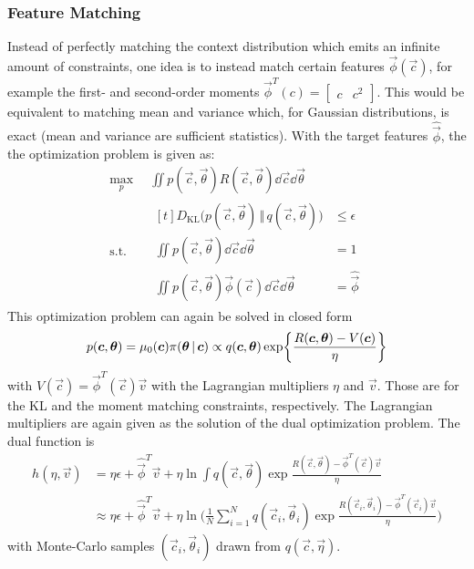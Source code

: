 			\subsubsection{Feature Matching}
				Instead of perfectly matching the context distribution which emits an infinite amount of constraints, one idea is to instead match certain features \( \vec{\phi}(\vec{c}) \), for example the first- and second-order moments \( \vec{\phi}^T(c) = \begin{bmatrix} c & c^2 \end{bmatrix} \). This would be equivalent to matching mean and variance which, for Gaussian distributions, is exact (mean and variance are sufficient statistics). With the target features \( \hat{\vec{\phi}} \), the the optimization problem is given as:
				\begin{equation*}
					\begin{aligned}
						\max_p \,           & \iint\! p(\vec{c}, \vec{\theta}) R(\vec{c}, \vec{\theta}) \dd{\vec{c}} \dd{\vec{\theta}} \\
						\mathrm{s.t.} \quad &
						\begin{aligned}[t]
							D_\mathrm{KL}\big( p(\vec{c}, \vec{\theta}) \,\Vert\, q(\vec{c}, \vec{\theta}) \big) & \leq \epsilon      \\
							\iint\! p(\vec{c}, \vec{\theta}) \dd{\vec{c}} \dd{\vec{\theta}}                      & = 1                \\
							\iint\! p(\vec{c}, \vec{\theta}) \vec{\phi}(\vec{c}) \dd{\vec{c}} \dd{\vec{\theta}}  & = \hat{\vec{\phi}}
						\end{aligned}
					\end{aligned}
				\end{equation*}
				This optimization problem can again be solved in closed form
				\begin{equation*}
					p(\bm{c}, \bm{\theta})
					= \mu_0(\bm{c}) \pi(\bm{\theta} \,\vert\, \bm{c})
					\propto q(\bm{c}, \bm{\theta}) \exp{ \frac{R(\bm{c}, \bm{\theta}) - V(\bm{c})}{\eta} }
				\end{equation*}
				with \( V(\vec{c}) = \vec{\phi}^T(\vec{c}) \vec{v} \) with the Lagrangian multipliers \(\eta\) and \(\vec{v}\). Those are for the KL and the moment matching constraints, respectively. The Lagrangian multipliers are again given as the solution of the dual optimization problem. The dual function is
				\begin{align*}
					h(\eta, \vec{v})
					 & = \eta\epsilon + \hat{\vec{\phi}}^T \vec{v} + \eta \ln \int\! q(\vec{c}, \vec{\theta}) \exp{ \frac{R(\vec{c}, \vec{\theta}) - \vec{\phi}^T(\vec{c}) \vec{v}}{\eta} }                                                         \\
					 & \approx \eta\epsilon + \hat{\vec{\phi}}^T \vec{v} + \eta \ln \Bigg(\! \frac{1}{N} \sum_{i = 1}^{N} q(\vec{c}_i, \vec{\theta}_i) \exp{ \frac{R(\vec{c}_i, \vec{\theta}_i) - \vec{\phi}^T(\vec{c}_i) \vec{v}}{\eta} } \!\Bigg)
				\end{align*}
				with Monte-Carlo samples \( (\vec{c}_i, \vec{\theta}_i) \) drawn from \( q(\vec{c}, \vec{\eta}) \).

